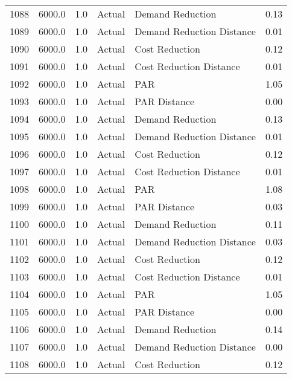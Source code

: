 \begin{longtable}{lrrllr}
1088 &       6000.0 &     1.0 &         Actual &           Demand Reduction &   0.13 \\
1089 &       6000.0 &     1.0 &         Actual &  Demand Reduction Distance &   0.01 \\
1090 &       6000.0 &     1.0 &         Actual &             Cost Reduction &   0.12 \\
1091 &       6000.0 &     1.0 &         Actual &    Cost Reduction Distance &   0.01 \\
1092 &       6000.0 &     1.0 &         Actual &                        PAR &   1.05 \\
1093 &       6000.0 &     1.0 &         Actual &               PAR Distance &   0.00 \\
1094 &       6000.0 &     1.0 &         Actual &           Demand Reduction &   0.13 \\
1095 &       6000.0 &     1.0 &         Actual &  Demand Reduction Distance &   0.01 \\
1096 &       6000.0 &     1.0 &         Actual &             Cost Reduction &   0.12 \\
1097 &       6000.0 &     1.0 &         Actual &    Cost Reduction Distance &   0.01 \\
1098 &       6000.0 &     1.0 &         Actual &                        PAR &   1.08 \\
1099 &       6000.0 &     1.0 &         Actual &               PAR Distance &   0.03 \\
1100 &       6000.0 &     1.0 &         Actual &           Demand Reduction &   0.11 \\
1101 &       6000.0 &     1.0 &         Actual &  Demand Reduction Distance &   0.03 \\
1102 &       6000.0 &     1.0 &         Actual &             Cost Reduction &   0.12 \\
1103 &       6000.0 &     1.0 &         Actual &    Cost Reduction Distance &   0.01 \\
1104 &       6000.0 &     1.0 &         Actual &                        PAR &   1.05 \\
1105 &       6000.0 &     1.0 &         Actual &               PAR Distance &   0.00 \\
1106 &       6000.0 &     1.0 &         Actual &           Demand Reduction &   0.14 \\
1107 &       6000.0 &     1.0 &         Actual &  Demand Reduction Distance &   0.00 \\
1108 &       6000.0 &     1.0 &         Actual &             Cost Reduction &   0.12 \\

\end{longtable}
